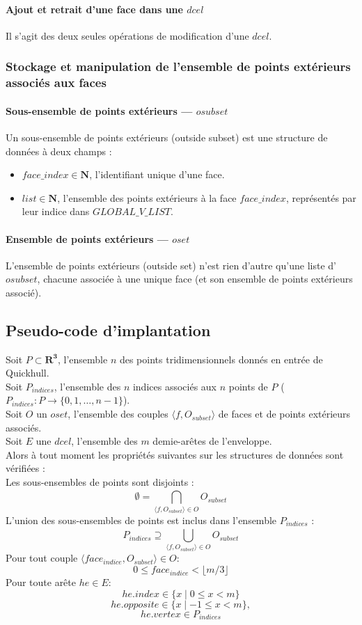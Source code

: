 \documentclass[]{article}
\begin{document}
\paragraph{Ajout et retrait d'une face dans une $dcel$}
Il s'agit des deux seules opérations de modification d'une $dcel$.

\subsubsection{Stockage et manipulation de l'ensemble de points extérieurs associés aux faces}
\paragraph*{Sous-ensemble de points extérieurs — $osubset$}
Un sous-ensemble de points extérieurs (outside subset) est une structure de données à deux champs :
\begin{itemize}
	\item $face\_index \in \mathbf{N}$, l'identifiant unique d'une face.
	\item $list \in \mathbf{N}$, l'ensemble des points extérieurs à la face $face\_index$, représentés par leur indice dans $GLOBAL\_V\_LIST$.
\end{itemize}

\paragraph*{Ensemble de points extérieurs — $oset$}
L'ensemble de points extérieurs (outside set) n'est rien d'autre qu'une liste d'$osubset$, chacune associée à une unique face (et son ensemble de points extérieurs associé).

\subsection{Pseudo-code d'implantation}
Soit $P \subset \mathbf{R^3} $, l'ensemble $n$ des points tridimensionnels donnés en entrée de Quickhull.\\
Soit $P_{indices}$, l'ensemble des $n$ indices associés aux $n$ points de $P$ ($P_{indices}: P \rightarrow \{ 0, 1, \ldots, {n - 1} \}$).\\
Soit $O$ un $oset$, l'ensemble des couples $\langle f, O_{subset} \rangle$ de faces et de points extérieurs associés.\\
Soit $E$ une $dcel$, l'ensemble des $m$ demie-arêtes de l'enveloppe.\\
Alors à tout moment les propriétés suivantes sur les structures de données sont vérifiées :\\
Les sous-ensembles de points sont disjoints :
\[
	\emptyset = \bigcap_{\langle f, O_{subset} \rangle \in O}^{} { O_{subset}}
\]
L'union des sous-ensembles de points est inclus dans l'ensemble $P_{indices}$ :
\[
	P_{indices} \supseteq \bigcup_{\langle f, O_{subset} \rangle \in O}^{} O_{subset}
\]
Pour tout couple $\langle face_{indice}, O_{subset} \rangle \in O$:
\[
	0 \leq face_{indice} < \lfloor m / 3 \rfloor
\]
Pour toute arête $he \in E$:
\[
	he.index \in \{x \mid 0 \leq x < m\}
\]
\[
	he.opposite \in \{x \mid -1 \leq x < m\},
\]
\[
	he.vertex \in P_{indices}
\]
\end{document}
